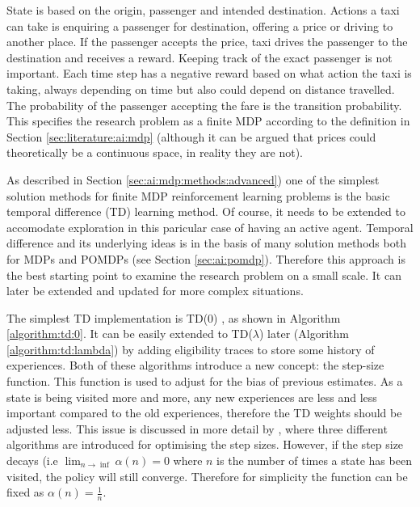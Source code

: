 State is based on the origin, passenger and intended destination. Actions a
taxi can take is enquiring a passenger for destination, offering a price or
driving to another place. If the passenger accepts the price, taxi drives the
passenger to the destination and receives a reward. Keeping track of the exact
passenger is not important. Each time step has a negative reward based on what
action the taxi is taking, always depending on time but also could depend on
distance travelled. The probability of the passenger accepting the fare is the
transition probability. This specifies the research problem as a finite MDP
according to the definition in Section \ref{sec:literature:ai:mdp} (although it
can be argued that prices could theoretically be a continuous space, in reality
they are not).

As described in Section \ref{sec:ai:mdp:methods:advanced}) one of the simplest
solution methods for finite MDP reinforcement learning problems is the basic
temporal difference (TD) learning method. Of course, it needs to be extended to
accomodate exploration in this paricular case of having an active agent.
Temporal difference and its underlying ideas is in the basis of many solution
methods both for MDPs and POMDPs (see Section \ref{sec:ai:pomdp}). Therefore
this approach is the best starting point to examine the research problem on a
small scale. It can later be extended and updated for more complex situations.

The simplest TD implementation is TD(0) \parencite{Russell2010ai+modern}, as
shown in Algorithm \ref{algorithm:td:0}. It can be easily extended to
TD(\(\lambda\)) later (Algorithm \ref{algorithm:td:lambda}) by adding eligibility
traces to store some history of experiences. Both of these algorithms introduce
a new concept: the step-size function. This function is used to adjust for the
bias of previous estimates. As a state is being visited more and more, any new
experiences are less and less important compared to the old experiences,
therefore the TD weights should be adjusted less. This issue is discussed in
more detail by \textcite{Sutton1994ai+stepsize}, where three different
algorithms are introduced for optimising the step sizes. However, if the step
size decays (i.e \(\lim_{n \to \inf}\alpha(n) = 0\) where \(n\) is the number
of times a state has been visited, the policy will still converge. Therefore
for simplicity the function can be fixed as \(\alpha(n)=\frac{1}{n}\).


